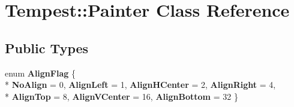 \hypertarget{class_tempest_1_1_painter}{\section{Tempest\+:\+:Painter Class Reference}
\label{class_tempest_1_1_painter}
}
\subsection*{Public Types}
\begin{DoxyCompactItemize}
\item 
\hypertarget{class_tempest_1_1_painter_ac31645aad05767fea4caa47ec70bce77}{enum {\bfseries Align\+Flag} \{ \\*
{\bfseries No\+Align} = 0, 
{\bfseries Align\+Left} = 1, 
{\bfseries Align\+H\+Center} = 2, 
{\bfseries Align\+Right} = 4, 
\\*
{\bfseries Align\+Top} = 8, 
{\bfseries Align\+V\+Center} = 16, 
{\bfseries Align\+Bottom} = 32
 \}}\label{class_tempest_1_1_painter_ac31645aad05767fea4caa47ec70bce77}

\end{DoxyCompactItemize}
